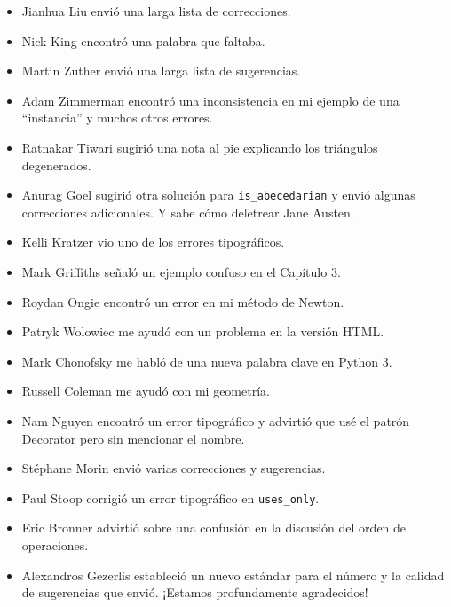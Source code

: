 \documentclass[10pt]{book}
\begin{document}
\begin{itemize}
\item Jianhua Liu envió una larga lista de correcciones.

\item Nick King encontró una palabra que faltaba.

\item Martin Zuther envió una larga lista de sugerencias.

\item Adam Zimmerman encontró una inconsistencia en mi ejemplo
de una ``instancia'' y muchos otros errores.

\item Ratnakar Tiwari sugirió una nota al pie explicando los triángulos
degenerados.

\item Anurag Goel sugirió otra solución para \verb"is_abecedarian"
y envió algunas correcciones adicionales.  Y sabe cómo
deletrear Jane Austen.

\item Kelli Kratzer vio uno de los errores tipográficos.

\item Mark Griffiths señaló un ejemplo confuso en el Capítulo 3.

\item Roydan Ongie encontró un error en mi método de Newton.

\item Patryk Wolowiec me ayudó con un problema en la versión HTML.

\item Mark Chonofsky me habló de una nueva palabra clave en Python 3.

\item Russell Coleman me ayudó con mi geometría.

\item Nam Nguyen encontró un error tipográfico y advirtió que usé el patrón Decorator
pero sin mencionar el nombre.

\item St\'{e}phane Morin envió varias correcciones y sugerencias.

\item Paul Stoop corrigió un error tipográfico en \verb+uses_only+.

\item Eric Bronner advirtió sobre una confusión en la discusión del
orden de operaciones.

\item Alexandros Gezerlis estableció un nuevo estándar para el número y
la calidad de sugerencias que envió.  ¡Estamos profundamente agradecidos!


\end{itemize}
\end{document}
